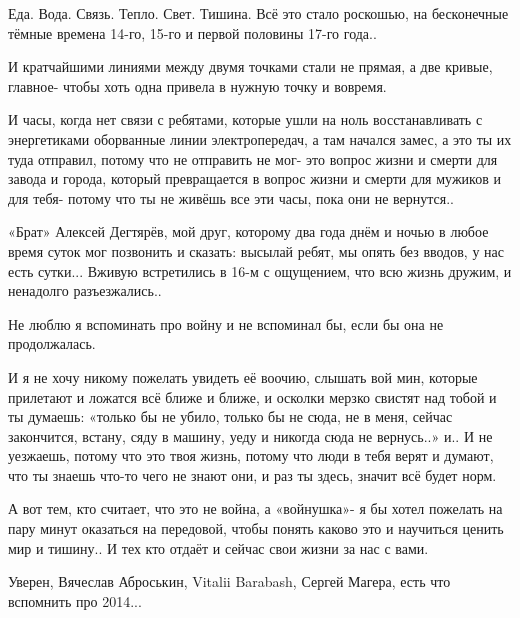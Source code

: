 Еда. Вода. Связь. Тепло. Свет. Тишина. Всё это стало роскошью, на бесконечные
тёмные времена 14-го, 15-го и первой половины 17-го года.. 

И кратчайшими линиями между двумя точками стали не прямая, а две кривые,
главное- чтобы хоть одна привела в нужную точку и вовремя. 

И часы, когда нет связи с ребятами, которые ушли на ноль восстанавливать с
энергетиками оборванные линии электропередач, а там начался замес, а это ты их
туда отправил, потому что не отправить не мог- это вопрос жизни и смерти для
завода и города, который превращается в вопрос жизни и смерти для мужиков и для
тебя- потому что ты не живёшь все эти часы, пока они не вернутся.. 

«Брат» Алексей Дегтярёв, мой друг, которому два года днём и ночью в любое время
суток мог позвонить и сказать: высылай ребят, мы опять без вводов, у нас есть
сутки... Вживую встретились в 16-м с ощущением, что всю жизнь дружим, и ненадолго
разъезжались..

\begin{multicols}{2}


\end{multicols}

Не люблю я вспоминать про войну и не вспоминал бы, если бы она не продолжалась. 

И я не хочу никому пожелать увидеть её воочию, слышать вой мин, которые
прилетают и ложатся всё ближе и ближе, и осколки мерзко свистят над тобой и ты
думаешь: «только бы не убило, только бы не сюда, не в меня, сейчас закончится,
встану, сяду в машину, уеду и никогда сюда не вернусь..» и.. И не уезжаешь,
потому что это твоя жизнь, потому что люди в тебя верят и думают, что ты знаешь
что-то чего не знают они, и раз ты здесь, значит всё будет норм.

А вот тем, кто считает, что это не война, а «войнушка»- я бы хотел пожелать на
пару минут оказаться на передовой, чтобы понять каково это и научиться ценить
мир и тишину.. И тех кто отдаёт и сейчас свои жизни за нас с вами.

Уверен, Вячеслав Аброськин, Vitalii Barabash, Сергей Магера, есть что вспомнить
про 2014...
